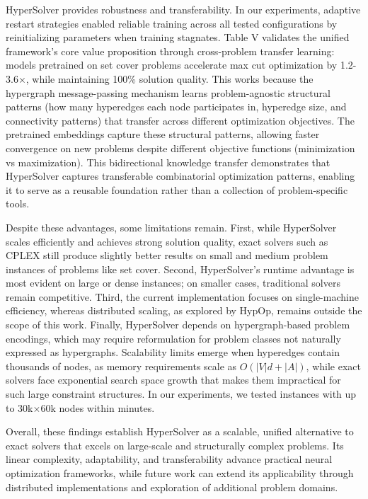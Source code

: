 \documentclass[conference]{IEEEtran}
\begin{document}
HyperSolver provides robustness and transferability. In our experiments, adaptive restart strategies enabled reliable training across all tested configurations by reinitializing parameters when training stagnates. Table V validates the unified framework's core value proposition through cross-problem transfer learning: models pretrained on set cover problems accelerate max cut optimization by 1.2-3.6\(\times\), while maintaining 100\% solution quality. This works because the hypergraph message-passing mechanism learns problem-agnostic structural patterns (how many hyperedges each node participates in, hyperedge size, and connectivity patterns) that transfer across different optimization objectives. The pretrained embeddings capture these structural patterns, allowing faster convergence on new problems despite different objective functions (minimization vs maximization). This bidirectional knowledge transfer demonstrates that HyperSolver captures transferable combinatorial optimization patterns, enabling it to serve as a reusable foundation rather than a collection of problem-specific tools.

Despite these advantages, some limitations remain. First, while HyperSolver scales efficiently and achieves strong solution quality, exact solvers such as CPLEX still produce slightly better results on small and medium problem instances of problems like set cover. Second, HyperSolver's runtime advantage is most evident on large or dense instances; on smaller cases, traditional solvers remain competitive. Third, the current implementation focuses on single-machine efficiency, whereas distributed scaling, as explored by HypOp, remains outside the scope of this work. Finally, HyperSolver depends on hypergraph-based problem encodings, which may require reformulation for problem classes not naturally expressed as hypergraphs. Scalability limits emerge when hyperedges contain thousands of nodes, as memory requirements scale as \(O(|V|d + |A|)\), while exact solvers face exponential search space growth that makes them impractical for such large constraint structures. In our experiments, we tested instances with up to 30k\(\times\)60k nodes within minutes. 

Overall, these findings establish HyperSolver as a scalable, unified alternative to exact solvers that excels on large-scale and structurally complex problems. Its linear complexity, adaptability, and transferability advance practical neural optimization frameworks, while future work can extend its applicability through distributed implementations and exploration of additional problem domains.
\end{document}
